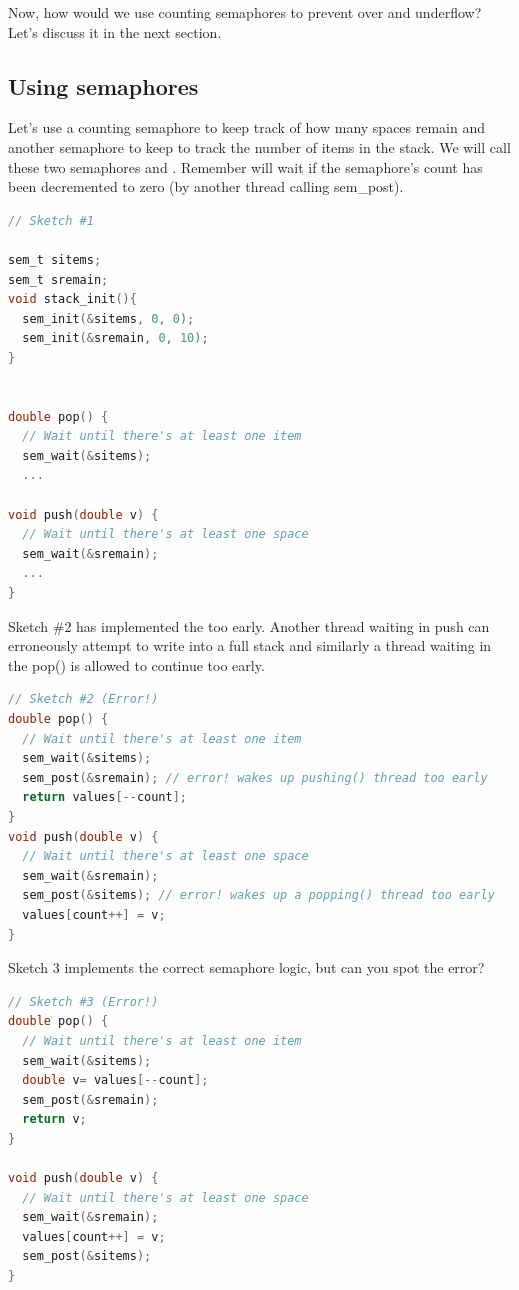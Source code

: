 Now, how would we use counting semaphores to prevent over and underflow?
Let's discuss it in the next section.

\subsection{Using semaphores}

Let's use a counting semaphore to keep track of how many spaces remain and another semaphore to keep to track the number of items in the stack.
We will call these two semaphores  and .
Remember  will wait if the semaphore's count has been decremented to zero (by another thread calling sem\_post).

\begin{lstlisting}[language=C]
// Sketch #1

sem_t sitems;
sem_t sremain;
void stack_init(){
  sem_init(&sitems, 0, 0);
  sem_init(&sremain, 0, 10);
}


double pop() {
  // Wait until there's at least one item
  sem_wait(&sitems);
  ...

void push(double v) {
  // Wait until there's at least one space
  sem_wait(&sremain);
  ...
}
\end{lstlisting}

Sketch \#2 has implemented the  too early.
Another thread waiting in push can erroneously attempt to write into a full stack and similarly a thread waiting in the pop() is allowed to continue too early.

\begin{lstlisting}[language=C]
// Sketch #2 (Error!)
double pop() {
  // Wait until there's at least one item
  sem_wait(&sitems);
  sem_post(&sremain); // error! wakes up pushing() thread too early
  return values[--count];
}
void push(double v) {
  // Wait until there's at least one space
  sem_wait(&sremain);
  sem_post(&sitems); // error! wakes up a popping() thread too early
  values[count++] = v;
}
\end{lstlisting}

Sketch 3 implements the correct semaphore logic, but can you spot the error?

\begin{lstlisting}[language=C]
// Sketch #3 (Error!)
double pop() {
  // Wait until there's at least one item
  sem_wait(&sitems);
  double v= values[--count];
  sem_post(&sremain);
  return v;
}

void push(double v) {
  // Wait until there's at least one space
  sem_wait(&sremain);
  values[count++] = v;
  sem_post(&sitems);
}
\end{lstlisting}

